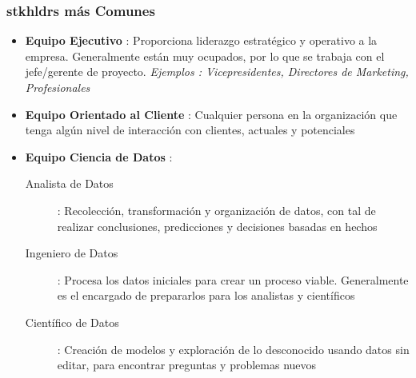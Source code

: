 \subsubsection{\gls{stkhldrs} más Comunes}
\begin{itemize}
    \item {\textbf{Equipo Ejecutivo} : Proporciona liderazgo estratégico y operativo a la empresa. Generalmente están muy ocupados, por lo que se trabaja con el jefe/gerente de proyecto. \textit{Ejemplos : Vicepresidentes, Directores de Marketing, Profesionales}}
    \item {\textbf{Equipo Orientado al Cliente} : Cualquier persona en la organización que tenga algún nivel de interacción con clientes, actuales y potenciales}
    \item {\textbf{Equipo Ciencia de Datos} : 
    \begin{description}
        \item[Analista de Datos]{: Recolección, transformación y organización de datos, con tal de realizar conclusiones, predicciones y decisiones basadas en hechos}
        \item[Ingeniero de Datos]{ : Procesa los datos iniciales para crear un proceso viable. Generalmente es el encargado de prepararlos para los analistas y científicos}
        \item[Científico de Datos]{ : Creación de modelos y exploración de lo desconocido usando datos sin editar, para encontrar preguntas y problemas nuevos}
    \end{description}}
\end{itemize}


\newpage